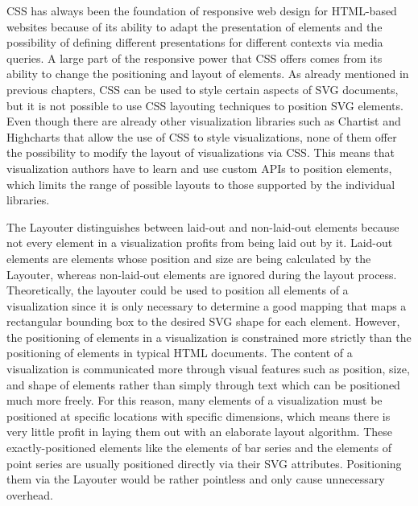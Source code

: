 CSS has always been the foundation of responsive web design for HTML-based websites because of its ability to adapt the presentation of elements and the possibility of defining different presentations for different contexts via media queries.
A large part of the responsive power that CSS offers comes from its ability to change the positioning and layout of elements.
As already mentioned in previous chapters, CSS can be used to style certain aspects of SVG documents, but it is not possible to use CSS layouting techniques to position SVG elements.
Even though there are already other visualization libraries such as Chartist \parencite{Chartist} and Highcharts \parencite{Highcharts} that allow the use of CSS to style visualizations, none of them offer the possibility to modify the layout of visualizations via CSS.
This means that visualization authors have to learn and use custom APIs to position elements, which limits the range of possible layouts to those supported by the individual libraries. 

The Layouter distinguishes between laid-out and non-laid-out elements because not every element in a visualization profits from being laid out by it. 
Laid-out elements are elements whose position and size are being calculated by the Layouter, whereas non-laid-out elements are ignored during the layout process. 
Theoretically, the layouter could be used to position all elements of a visualization since it is only necessary to determine a good mapping that maps a rectangular bounding box to the desired SVG shape for each element.
However, the positioning of elements in a visualization is constrained more strictly than the positioning of elements in typical HTML documents.
The content of a visualization is communicated more through visual features such as position, size, and shape of elements rather than simply through text which can be positioned much more freely.  
For this reason, many elements of a visualization must be positioned at specific locations with specific dimensions, which means there is very little profit in laying them out with an elaborate layout algorithm.
These exactly-positioned elements like the  elements of bar series and the  elements of point series are usually positioned directly via their SVG attributes.
Positioning them via the Layouter would be rather pointless and only cause unnecessary overhead.

